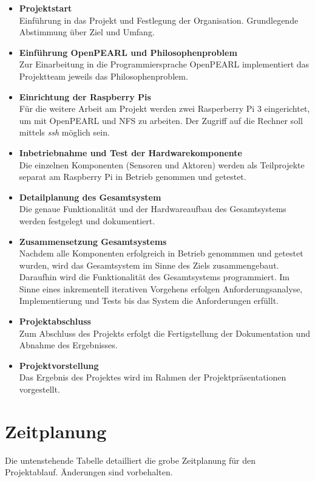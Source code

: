 	\begin{itemize}
		\item \textbf{Projektstart}\\
		Einführung in das Projekt und Festlegung der Organisation. Grundlegende Abstimmung über Ziel und Umfang.
		\item \textbf{Einführung OpenPEARL und Philosophenproblem}\\
		 Zur Einarbeitung in die Programmiersprache OpenPEARL implementiert das Projektteam jeweils das Philosophenproblem.
		\item \textbf{Einrichtung der Raspberry Pis}\\
		 Für die weitere Arbeit am Projekt werden zwei Rasperberry Pi 3 eingerichtet, um mit OpenPEARL und NFS zu arbeiten. Der Zugriff auf die Rechner soll mittels \emph{ssh} möglich sein.
		\item \textbf{Inbetriebnahme und Test der Hardwarekomponente}\\  Die einzelnen Komponenten (Sensoren und Aktoren) werden als Teilprojekte separat am Raspberry Pi in Betrieb genommen und getestet.
		\item \textbf{Detailplanung des Gesamtsystem}\\  Die genaue Funktionalität und der Hardwareaufbau des Gesamtsystems werden festgelegt und dokumentiert.
		\item \textbf{Zusammensetzung Gesamtsystems}\\
		 Nachdem alle Komponenten erfolgreich in Betrieb genommmen und getestet wurden, wird das Gesamtsystem im Sinne des Ziels zusammengebaut. Daraufhin wird die Funktionalität des Gesamtsystems programmiert. Im Sinne eines inkrementell iterativen Vorgehens erfolgen Anforderungsanalyse, Implementierung und Tests bis das System die Anforderungen erfüllt.
		 \item \textbf{Projektabschluss}\\
		 Zum Abschluss des Projekts erfolgt die Fertigstellung der Dokumentation und Abnahme des Ergebnisses.
		 \item \textbf{Projektvorstellung}\\
		 Das Ergebnis des Projektes wird im Rahmen der Projektpräsentationen vorgestellt.
	\end{itemize}

	\section{Zeitplanung}
	Die untenstehende Tabelle detailliert die grobe Zeitplanung für den Projektablauf. Änderungen sind vorbehalten.\\
	
